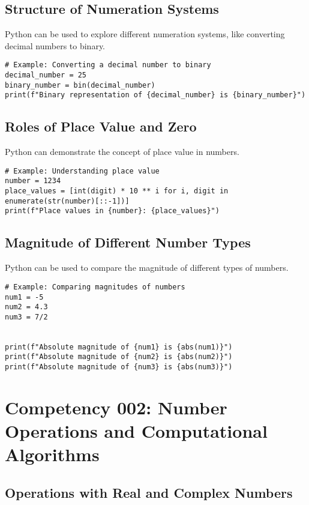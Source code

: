 \documentclass{book}
\begin{document}
\subsection{Structure of Numeration Systems}
Python can be used to explore different numeration systems, like converting decimal numbers to binary.


\begin{lstlisting}[style=pythonstyle]
# Example: Converting a decimal number to binary
decimal_number = 25
binary_number = bin(decimal_number)
print(f"Binary representation of {decimal_number} is {binary_number}")
\end{lstlisting}


\subsection{Roles of Place Value and Zero}
Python can demonstrate the concept of place value in numbers.


\begin{lstlisting}[style=pythonstyle]
# Example: Understanding place value
number = 1234
place_values = [int(digit) * 10 ** i for i, digit in enumerate(str(number)[::-1])]
print(f"Place values in {number}: {place_values}")
\end{lstlisting}


\subsection{Magnitude of Different Number Types}
Python can be used to compare the magnitude of different types of numbers.


\begin{lstlisting}[style=pythonstyle]
# Example: Comparing magnitudes of numbers
num1 = -5
num2 = 4.3
num3 = 7/2


print(f"Absolute magnitude of {num1} is {abs(num1)}")
print(f"Absolute magnitude of {num2} is {abs(num2)}")
print(f"Absolute magnitude of {num3} is {abs(num3)}")
\end{lstlisting}







\section{Competency 002: Number Operations and Computational Algorithms}
\subsection{Operations with Real and Complex Numbers}
\end{document}
